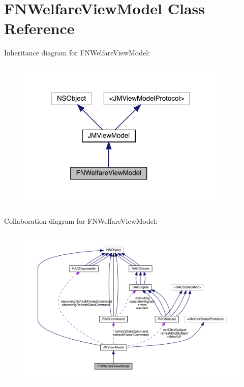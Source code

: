 \hypertarget{interface_f_n_welfare_view_model}{}\section{F\+N\+Welfare\+View\+Model Class Reference}
\label{interface_f_n_welfare_view_model}


Inheritance diagram for F\+N\+Welfare\+View\+Model\+:\nopagebreak
\begin{figure}[H]
\begin{center}
\leavevmode
\includegraphics[width=284pt]{interface_f_n_welfare_view_model__inherit__graph}
\end{center}
\end{figure}


Collaboration diagram for F\+N\+Welfare\+View\+Model\+:\nopagebreak
\begin{figure}[H]
\begin{center}
\leavevmode
\includegraphics[width=350pt]{interface_f_n_welfare_view_model__coll__graph}
\end{center}
\end{figure}
